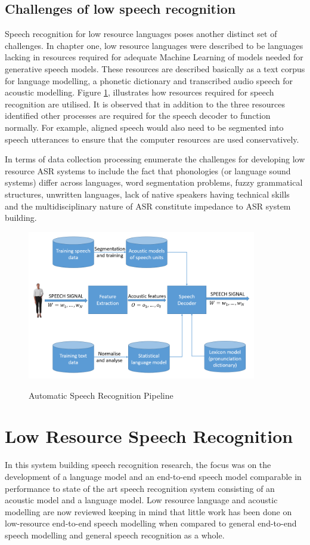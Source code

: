\subsection{Challenges of low speech recognition}
Speech recognition for low resource languages poses another distinct set of challenges.  In chapter one, low resource languages were described to be languages lacking in resources required for adequate Machine Learning of models needed for generative speech models.  These resources are described basically as a text corpus for language modelling, a phonetic dictionary and transcribed audio speech for acoustic modelling. Figure \ref{fig_2_2_asr_pipeline}, illustrates how resources required for speech recognition are utilised.  It is observed that in addition to the three resources identified other processes are required for the speech decoder to function normally.  For example, aligned speech would also need to be segmented into speech utterances to ensure that the computer resources are used conservatively.

In terms of data collection processing \cite{besacier2014automatic} enumerate the  challenges for developing low resource ASR systems to include the fact that phonologies (or language sound systems) differ across languages, word segmentation problems, fuzzy grammatical structures, unwritten languages, lack of native speakers having technical skills and the multidisciplinary nature of ASR constitute impedance to ASR system building.

\begin{figure}
\centering
  \includegraphics[width=10cm]{thesis/images/asr_pipeline}\\
  \caption{Automatic Speech Recognition Pipeline} \cite{besacier2014automatic}\label{fig_2_2_asr_pipeline}
\end{figure}

 \section{Low Resource Speech Recognition}
In this system building speech recognition research, the focus was on the development of a language model and an end-to-end speech model comparable in performance to state of the art speech recognition system consisting of an acoustic model and a language model.  Low resource language and acoustic modelling are now reviewed keeping in mind that little work has been done on low-resource end-to-end speech modelling when compared to general end-to-end speech modelling and general speech recognition as a whole.  

